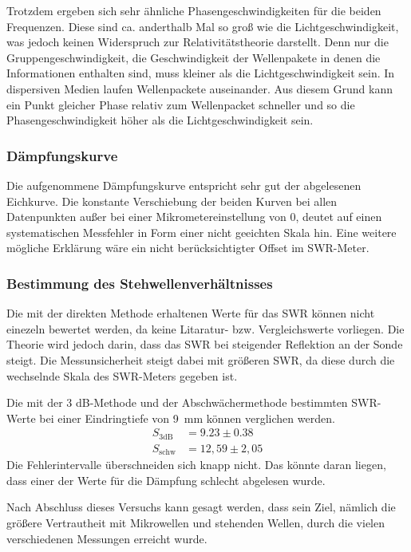         Trotzdem ergeben sich sehr ähnliche Phasengeschwindigkeiten für die beiden Frequenzen.
        Diese sind ca. anderthalb Mal so groß wie die Lichtgeschwindigkeit, was jedoch keinen Widerspruch zur Relativitätstheorie darstellt.
        Denn nur die Gruppengeschwindigkeit, die Geschwindigkeit der Wellenpakete in denen die Informationen enthalten sind, muss kleiner als die Lichtgeschwindigkeit sein.
        In dispersiven Medien laufen Wellenpackete auseinander.
        Aus diesem Grund kann ein Punkt gleicher Phase relativ zum Wellenpacket schneller und so die Phasengeschwindigkeit höher als die Lichtgeschwindigkeit sein.

    \subsubsection*{Dämpfungskurve}
        Die aufgenommene Dämpfungskurve entspricht sehr gut der abgelesenen Eichkurve. Die konstante Verschiebung der beiden Kurven bei allen Datenpunkten außer bei einer Mikrometereinstellung von 0, deutet auf einen systematischen Messfehler in Form einer nicht geeichten Skala hin. Eine weitere mögliche Erklärung wäre ein nicht berücksichtigter Offset im SWR-Meter.
    
    \subsubsection*{Bestimmung des Stehwellenverhältnisses}
        Die mit der direkten Methode erhaltenen Werte für das SWR können nicht einezeln bewertet werden, da keine Litaratur- bzw. Vergleichswerte vorliegen.
        Die Theorie wird jedoch darin, dass das SWR bei steigender Reflektion an der Sonde steigt.
        Die Messunsicherheit steigt dabei mit größeren SWR, da diese durch die wechselnde Skala des SWR-Meters gegeben ist.

        Die mit der 3 dB-Methode und der Abschwächermethode bestimmten SWR-Werte bei einer Eindringtiefe von \SI{9}{mm} können verglichen werden.
        \begin{align*}
            S_{\mathrm{3dB}} &= 9.23 \pm 0.38 \\
            S_{\mathrm{schw}} &= 12,59 \pm 2,05
        \end{align*}
        Die Fehlerintervalle überschneiden sich knapp nicht.
        Das könnte daran liegen, dass einer der Werte für die Dämpfung schlecht abgelesen wurde.

    
    Nach Abschluss dieses Versuchs kann gesagt werden, dass sein Ziel, nämlich die größere Vertrautheit mit Mikrowellen und stehenden Wellen, durch die vielen verschiedenen Messungen erreicht wurde.
